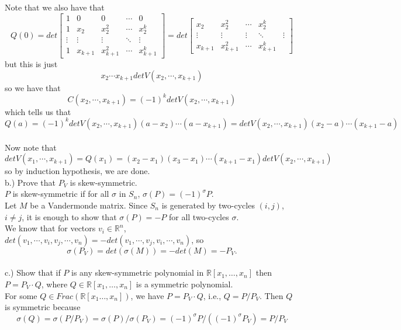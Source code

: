 \documentclass[12pt]{article}
\begin{document}
Note that we also have that
$$ Q(0) = det \begin{bmatrix} 1 & 0 & 0 & \cdots & 0 \\ 1 &x_2 & x_2^2 & \cdots & x_2^{k} \\ \vdots & \vdots & \vdots & \ddots & \vdots \\ 1 &x_{k+1} & x_{k+1}^2 & \cdots & x_{k+1}^{k} \end{bmatrix} = det \begin{bmatrix}  x_2 & x_2^2 & \cdots & x_2^{k} \\ \vdots & \vdots & \vdots & \ddots & \vdots \\ x_{k+1} & x_{k+1}^2 & \cdots & x_{k+1}^{k} \end{bmatrix}$$
but this is just
$$x_2 \cdots x_{k+1} det V(x_2, \cdots , x_{k+1})$$
so we have that
$$C(x_2, \cdots, x_{k+1}) = (-1)^k det V(x_2, \cdots , x_{k+1})$$
which tells us that
$$Q(a) = (-1)^k det V(x_2, \cdots , x_{k+1}) (a - x_2) \cdots (a - x_{k+1}) = det V(x_2, \cdots , x_{k+1}) (x_2 - a) \cdots (x_{k+1} - a)$$\\

Now note that 
$$det V(x_1, \cdots, x_{k+1}) = Q(x_1) = (x_2 - x_1)(x_3 - x_1) \cdots (x_{k+1} - x_1) det V(x_2, \cdots, x_{k+1})$$
so by induction hypothesis, we are done. \\

b.) Prove that $P_V$ is skew-symmetric. \\

$P$ is skew-symmetric if for all $\sigma$ in $S_n$,
$\sigma(P) = (-1)^\sigma P$. \\

Let $M$ be a Vandermonde matrix. Since $S_n$ is generated by two-cycles $(i, j)$, $i \neq j$, it is enough to show that $\sigma(P) = -P$ for all two-cycles $\sigma$. \\

We know that for vectors $v_i \in \mathbb{R}^n$, $det(v_1, \cdots, v_i, v_j, \cdots, v_n) = -det(v_1, \cdots, v_j, v_i, \cdots, v_n)$, so $$\sigma(P_V)= det(\sigma(M)) =  -det(M) = -P_V.$$\\

c.) Show that if $P$ is any skew-symmetric polynomial in $\mathbb{R}[x_1, \dots, x_n]$ then $P = P_V \cdot Q$, where $Q \in \mathbb{R}[x_1, \dots, x_n]$ is a symmetric polynomial.\\

For some $Q \in Frac(\mathbb{R}[x_1…, x_n])$, we have $P = P_V\cdot Q$, i.e., $Q = P/P_V$. Then $Q$ is symmetric because 
$$\sigma(Q)  = \sigma(P/P_V ) = \sigma(P)/\sigma(P_V) 
= (-1)^\sigma P / ( (-1)^\sigma P_V) = P/P_V$$\\
\end{document}
